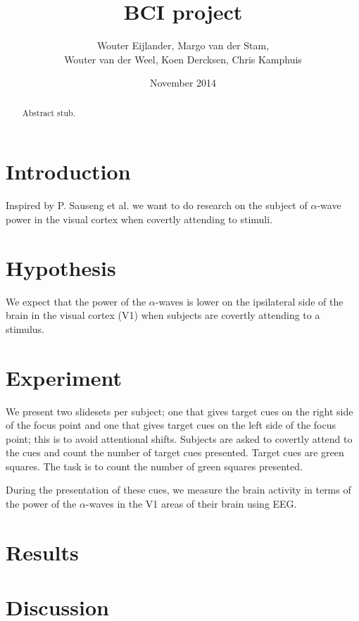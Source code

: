 \documentclass{article}
\title{BCI project}
\author{Wouter Eijlander, Margo van der Stam, 
				\\Wouter van der Weel, Koen Dercksen, Chris Kamphuis}
\date{November 2014}
\begin{document}
\maketitle
\begin{abstract}
Abstract stub.
\end{abstract}

\section{Introduction}
Inspired by P. Sauseng et al.\cite{Sauseng2005} we want to do research on the subject of $\alpha$-wave power in the visual cortex when covertly attending to stimuli. 

\section{Hypothesis}
We expect that the power of the $\alpha$-waves is lower on the ipsilateral side of the brain in the visual cortex (V1) when subjects are covertly attending to a stimulus.

\section{Experiment}

We present two slidesets per subject; one that gives target cues on the right side of the focus point and one that gives target cues on the left side of the focus point; this is to avoid attentional shifts. Subjects are asked to covertly attend to the cues and count the number of target cues presented. Target cues are green squares. The task is to count the number of green squares presented.

During the presentation of these cues, we measure the brain activity in terms of the power of the $\alpha$-waves in the V1 areas of their brain using EEG.

\section{Results}

\section{Discussion}



\end{document}
